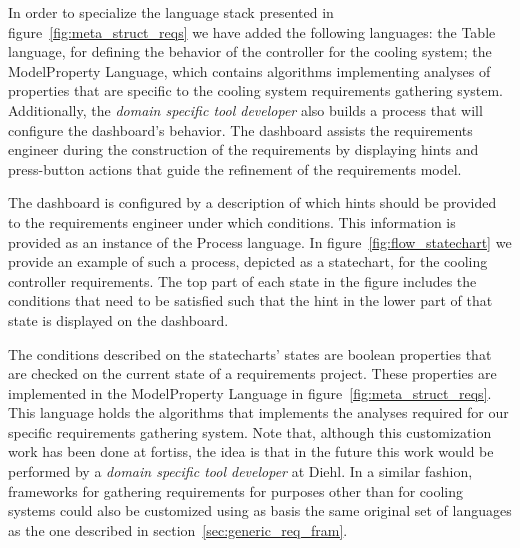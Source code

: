 In order to specialize the language stack presented in
figure~\ref{fig:meta_struct_reqs} we have added the following languages: the
\textsf{Table} language, for defining the behavior of the controller for the
cooling system; the \textsf{ModelProperty} Language, which contains algorithms
implementing analyses of properties that are specific to the cooling system
requirements gathering system.
Additionally, the \emph{domain specific tool developer} also builds a process
that will configure the dashboard's behavior. The dashboard assists the
requirements engineer during the construction of the requirements by displaying
hints and press-button actions that guide the refinement of the requirements
model.

The dashboard is configured by a description of which hints should be
provided to the requirements engineer under which conditions. This information
is provided as an instance of the \textsf{Process} language.
In figure~\ref{fig:flow_statechart} we provide an example of such a process,
depicted as a statechart, for the	cooling controller requirements.  
The top part of each state in the figure includes the conditions that need to be satisfied such that the hint in the lower part of
that state is displayed on the dashboard. 

The conditions described on the statecharts' states are boolean properties that
are checked on the current state of a requirements project. These properties are
implemented in the \textsf{ModelProperty} Language in
figure~\ref{fig:meta_struct_reqs}. This language holds the algorithms that implements
the analyses required for our specific requirements gathering system.
Note that, although this customization work has been done at fortiss, the idea
is that in the future this work would be performed by a \emph{domain specific tool
developer} at Diehl. In a similar fashion, frameworks for gathering requirements for purposes
other than for cooling systems could also be customized using as basis the same
original set of languages as the one described in
section~\ref{sec:generic_req_fram}.
\vspace{-.7cm}



